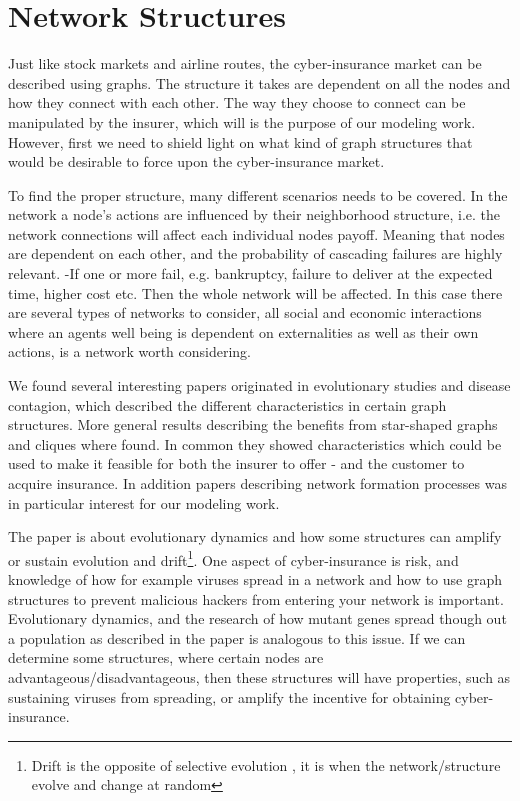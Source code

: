 \section{Network Structures}

Just like stock markets and airline routes, the cyber-insurance market can be described using graphs. The structure it takes are dependent on all the nodes and how they connect with each other. The way they choose to connect can be manipulated by the insurer, which will is the purpose of our modeling work. However, first we need to shield light on what kind of graph structures that would be desirable to force upon the cyber-insurance market.

To find the proper structure, many different scenarios needs to be covered. In the network a node's actions are influenced by their neighborhood structure, i.e. the network connections will affect each individual nodes payoff. Meaning that nodes are dependent on each other, and the probability of cascading failures are highly relevant. -If one or more fail, e.g. bankruptcy, failure to deliver at the expected time, higher cost etc. Then the whole network will be affected. In this case there are several types of networks to consider, all social and economic interactions where an agents well being is dependent on externalities as well as their own actions, is a network worth considering.


We found several interesting papers originated in evolutionary studies and disease contagion, which described the different characteristics in certain graph structures. More general results describing the benefits from star-shaped graphs and cliques where found. In common they showed characteristics which could be used to make it feasible for both the insurer to offer - and the customer to acquire insurance. In addition papers describing network formation processes was in particular interest for our modeling work. 

 The paper \cite{lieberman2005evolutionary} is about evolutionary dynamics and how some structures
can amplify or sustain evolution and drift\footnote{Drift is the opposite of selective evolution
, it is when the network/structure evolve and change at random}. One aspect of cyber-insurance is risk, and knowledge of how for example viruses spread in a network and how to use graph structures to prevent malicious hackers from entering your network is important. Evolutionary dynamics, and the research of how mutant genes spread though out a population as described in the paper is analogous to this issue.
If we can determine some structures, where certain nodes are advantageous/disadvantageous, then these structures will have properties, such as sustaining viruses from spreading, or amplify the incentive for obtaining cyber-insurance. 

